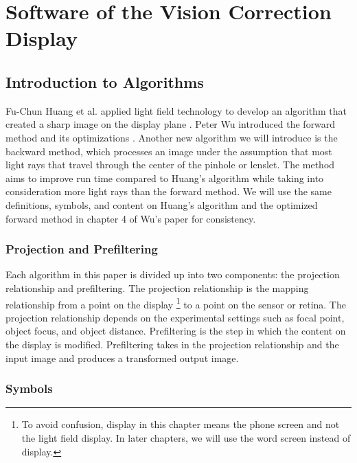 \chapter{Software of the Vision Correction Display}

\section{Introduction to Algorithms}

Fu-Chun Huang et al. applied light field technology to develop an algorithm that created a sharp image on the display plane \cite{Huang:EECS-2013-206}. Peter Wu introduced the forward method and its optimizations \cite{Wu:EECS-2016-67}. Another new algorithm we will introduce is the backward method, which processes an image under the assumption that most light rays that travel through the center of the pinhole or lenslet. The method aims to improve run time compared to Huang's algorithm while taking into consideration more light rays than the forward method. We will use the same definitions, symbols, and content on Huang's algorithm and the optimized forward method in chapter 4 of Wu's paper \cite{Wu:EECS-2016-67} for consistency.

\subsection{Projection and Prefiltering}

Each algorithm in this paper is divided up into two components: the projection relationship and prefiltering. The projection relationship is the mapping relationship from a point on the display \footnote{To avoid confusion, display in this chapter means the phone screen and not the light field display. In later chapters, we will use the word screen instead of display.} to a point on the sensor or retina. The projection relationship depends on the experimental settings such as focal point, object focus, and object distance. Prefiltering is the step in which the content on the display is modified. Prefiltering takes in the projection relationship and the input image and produces a transformed output image.

\subsection{Symbols}

